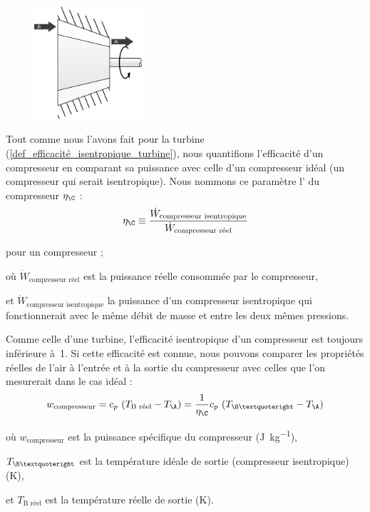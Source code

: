 		\begin{figure}
			\begin{center}
				\includegraphics[width=4cm]{images/symbole_compresseur.png}
			\end{center}
			\label{fig_schéma_compresseur2}
		\end{figure}

		Tout comme nous l’avons fait pour la turbine (\ref{def_efficacité_isentropique_turbine}), nous quantifions l’efficacité d’un compresseur en comparant sa puissance avec celle d’un compresseur idéal (un compresseur qui serait isentropique). Nous nommons ce paramètre l’ du compresseur $\eta_\C$ :
		\begin{equation}
			\eta_\C \equiv  \frac{\dot W_\text{compresseur isentropique}}{\dot W_\text{compresseur réel}}
			\label{def_efficacité_isentropique_compresseur}
		\end{equation}
		\begin{equationterms}
			\item pour un compresseur ;
			\item où \tab $\dot W_\text{compresseur réel}$ \tab\tab\tab est la puissance réelle consommée par le compresseur,
			\item et \tab $\dot W_\text{compresseur isentropique}$ \tab la puissance d’un compresseur isentropique qui fonctionnerait avec le même débit de masse et entre les deux mêmes pressions.
		\end{equationterms}

		Comme celle d’une turbine, l’efficacité isentropique d’un compresseur est toujours inférieure à~1. Si cette efficacité est connue, nous pouvons comparer les propriétés réelles de l’air à l’entrée et à la sortie du compresseur avec celles que l’on mesurerait dans le cas idéal :
		\begin{equation}
			w_\text{compresseur} = c_p \ (T_\text{B réel} - T_\A) = \frac{1}{\eta_\C} c_p \ (T_{\B’} - T_\A)
			\label{eq_puissance_compresseur}
		\end{equation}
		\begin{equationterms}
			\item où \tab $w_\text{compresseur}$ 	\tab est la puissance spécifique du compresseur (\si{\joule\per\kilogram}),
			\item 	\tab $T_{\B’}$ 					\tab\tab\tab est la température idéale de sortie (compresseur isentropique) (\si{\kelvin}),
			\item et \tab $T_\text{B réel}$ 			\tab est la température réelle de sortie (\si{\kelvin}).
		\end{equationterms}

